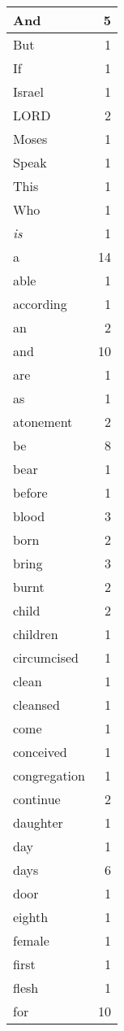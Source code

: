 \begin{center}
\begin{longtable}{l|r}
\hline \hline
\endlastfoot
And & 5 \\ \hline
But & 1 \\ \hline
If & 1 \\ \hline
Israel & 1 \\ \hline
LORD & 2 \\ \hline
Moses & 1 \\ \hline
Speak & 1 \\ \hline
This & 1 \\ \hline
Who & 1 \\ \hline
\emph{is} & 1 \\ \hline
a & 14 \\ \hline
able & 1 \\ \hline
according & 1 \\ \hline
an & 2 \\ \hline
and & 10 \\ \hline
are & 1 \\ \hline
as & 1 \\ \hline
atonement & 2 \\ \hline
be & 8 \\ \hline
bear & 1 \\ \hline
before & 1 \\ \hline
blood & 3 \\ \hline
born & 2 \\ \hline
bring & 3 \\ \hline
burnt & 2 \\ \hline
child & 2 \\ \hline
children & 1 \\ \hline
circumcised & 1 \\ \hline
clean & 1 \\ \hline
cleansed & 1 \\ \hline
come & 1 \\ \hline
conceived & 1 \\ \hline
congregation & 1 \\ \hline
continue & 2 \\ \hline
daughter & 1 \\ \hline
day & 1 \\ \hline
days & 6 \\ \hline
door & 1 \\ \hline
eighth & 1 \\ \hline
female & 1 \\ \hline
first & 1 \\ \hline
flesh & 1 \\ \hline
for & 10 \\ \hline

\end{longtable}
\end{center}
